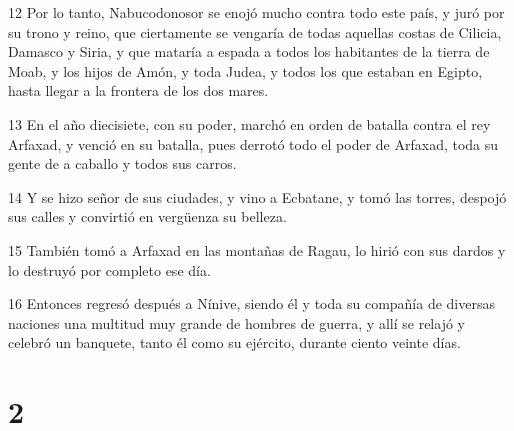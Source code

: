 \par 12 Por lo tanto, Nabucodonosor se enojó mucho contra todo este país, y juró por su trono y reino, que ciertamente se vengaría de todas aquellas costas de Cilicia, Damasco y Siria, y que mataría a espada a todos los habitantes de la tierra de Moab, y los hijos de Amón, y toda Judea, y todos los que estaban en Egipto, hasta llegar a la frontera de los dos mares.
\par 13 En el año diecisiete, con su poder, marchó en orden de batalla contra el rey Arfaxad, y venció en su batalla, pues derrotó todo el poder de Arfaxad, toda su gente de a caballo y todos sus carros.
\par 14 Y se hizo señor de sus ciudades, y vino a Ecbatane, y tomó las torres, despojó sus calles y convirtió en vergüenza su belleza.
\par 15 También tomó a Arfaxad en las montañas de Ragau, lo hirió con sus dardos y lo destruyó por completo ese día.
\par 16 Entonces regresó después a Nínive, siendo él y toda su compañía de diversas naciones una multitud muy grande de hombres de guerra, y allí se relajó y celebró un banquete, tanto él como su ejército, durante ciento veinte días.

\chapter{2}

